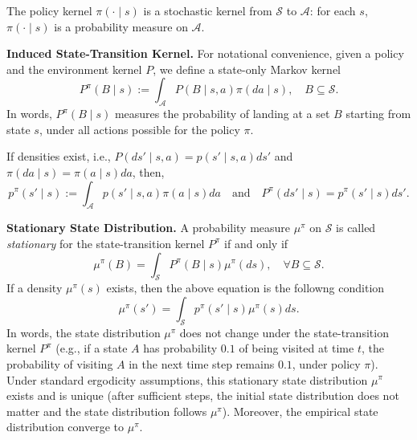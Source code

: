 \documentclass[
]{book}
\theoremstyle{definition}
\theoremstyle{definition}
\theoremstyle{definition}
\theoremstyle{definition}
\theoremstyle{remark}
\begin{document}
The policy kernel \(\pi(\cdot \mid s)\) is a stochastic kernel from \(\mathcal{S}\) to \(\mathcal{A}\): for each \(s\), \(\pi(\cdot \mid s)\) is a probability measure on \(\mathcal{A}\).

\textbf{Induced State-Transition Kernel.} For notational convenience, given a policy and the environment kernel \(P\), we define a state-only Markov kernel
\begin{equation}
P^\pi(B \mid s) := \int_{\mathcal{A}} P(B \mid s, a) \pi(da \mid s), \quad B \subseteq \mathcal{S}.
\label{eq:StateOnlyMarkovKernel}
\end{equation}
In words, \(P^\pi(B \mid s)\) measures the probability of landing at a set \(B\) starting from state \(s\), under all actions possible for the policy \(\pi\).

If densities exist, i.e., \(P(ds' \mid s, a) = p(s' \mid s, a) ds'\) and \(\pi(da \mid s) = \pi(a \mid s) da\), then,
\begin{equation}
p^\pi(s' \mid s) := \int_{\mathcal{A}} p(s' \mid s, a) \pi(a \mid s) da \quad\text{and}\quad P^{\pi}(d s' \mid s) = p^\pi(s' \mid s) ds'.
\label{eq:StateOnlyMarkovKernel-density}
\end{equation}

\textbf{Stationary State Distribution.} A probability measure \(\mu^\pi\) on \(\mathcal{S}\) is called \emph{stationary} for the state-transition kernel \(P^\pi\) if and only if
\begin{equation}
\mu^{\pi}(B) = \int_{\mathcal{S}} P^\pi(B \mid s) \mu^{\pi}(ds), \quad \forall B \subseteq \mathcal{S}.
\label{eq:StationaryDistribution-definition}
\end{equation}
If a density \(\mu^\pi(s)\) exists, then the above equation is the followng condition
\begin{equation}
\mu^{\pi}(s') = \int_{\mathcal{S}} p^\pi(s' \mid s) \mu^{\pi}(s) ds.
\label{eq:StationaryDistribution-definition-density}
\end{equation}
In words, the state distribution \(\mu^\pi\) does not change under the state-transition kernel \(P^\pi\) (e.g., if a state \(A\) has probability \(0.1\) of being visited at time \(t\), the probability of visiting \(A\) in the next time step remains \(0.1\), under policy \(\pi\)).
Under standard ergodicity assumptions, this stationary state distribution \(\mu^\pi\) exists and is unique (after sufficient steps, the initial state distribution does not matter and the state distribution follows \(\mu^\pi\)). Moreover, the empirical state distribution converge to \(\mu^\pi\).
\end{document}
